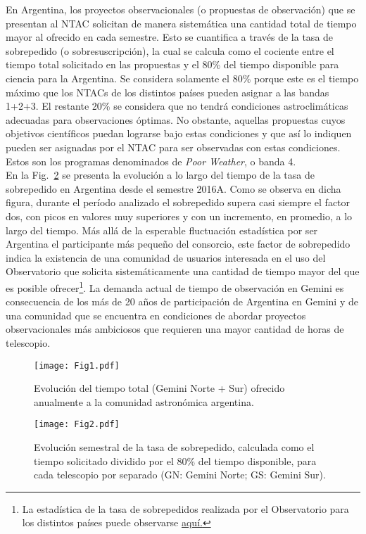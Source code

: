 \documentclass[baaa]{baaa}
\begin{document}
En Argentina, los proyectos observacionales (o propuestas de observación) que se presentan al NTAC solicitan de manera sistemática una cantidad total de tiempo mayor al ofrecido en cada semestre. Esto se cuantifica a través de la tasa de sobrepedido (o sobresuscripción), la cual se calcula como el cociente entre el tiempo total solicitado en las propuestas y el 80\% del tiempo disponible para ciencia para la Argentina. Se considera solamente el 80\% porque este es el tiempo máximo que los NTACs de los distintos países pueden asignar a las bandas 1+2+3. El restante 20\% se considera que no tendrá condiciones astroclimáticas adecuadas para observaciones óptimas. No obstante, aquellas propuestas cuyos objetivos científicos puedan lograrse bajo estas condiciones y que así lo indiquen pueden ser asignadas por el NTAC para ser observadas con estas condiciones. Estos son los programas denominados de {\em Poor Weather}, o banda 4.\\

En la Fig.~\ref{fig2} se presenta la evolución a lo largo del tiempo de la tasa de sobrepedido en Argentina desde el semestre 2016A. Como se observa en dicha figura, durante el período analizado el sobrepedido supera casi siempre el factor dos, con picos en valores muy superiores y con un incremento, en promedio, a lo largo del tiempo. Más allá de la esperable fluctuación estadística por ser Argentina el participante más pequeño del consorcio, este factor de sobrepedido indica la existencia de una comunidad de usuarios interesada en el uso del Observatorio que solicita sistemáticamente una cantidad de tiempo mayor del que es posible ofrecer\footnote{La estadística de la tasa de sobrepedidos realizada por el Observatorio para los distintos países puede observarse \href{https://www.gemini.edu/observing/science-operations-statistics}{aquí.}}. La demanda actual de tiempo de observación en Gemini es consecuencia de los más de 20 años de participación de Argentina en Gemini y de una comunidad que se encuentra en condiciones de abordar proyectos observacionales más ambiciosos que requieren una mayor cantidad de horas de telescopio.


\begin{figure}[!t]
\centering
\texttt{[image: Fig1.pdf]}
\caption{Evolución del tiempo total (Gemini Norte + Sur) ofrecido anualmente a la comunidad astronómica argentina.}
\label{fig1}
\end{figure}

\begin{figure}[!t]
\centering
\texttt{[image: Fig2.pdf]}
\caption{Evolución semestral de la tasa de sobrepedido, calculada como el tiempo solicitado dividido por el 80\% del tiempo disponible, para cada telescopio por separado (GN: Gemini Norte; GS: Gemini Sur).}
\label{fig2}
\end{figure}
\end{document}
